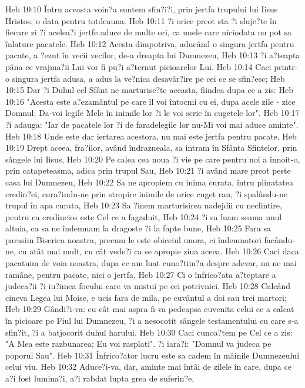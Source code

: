 Heb 10:10  Întru aceasta voin?a suntem sfin?i?i, prin jertfa trupului lui Iisus Hristos, o data pentru totdeauna.
Heb 10:11  ?i orice preot sta ?i sluje?te în fiecare zi ?i acelea?i jertfe aduce de multe ori, ca unele care niciodata nu pot sa înlature pacatele.
Heb 10:12  Acesta dimpotriva, aducând o singura jertfa pentru pacate, a ?ezut în vecii vecilor, de-a dreapta lui Dumnezeu,
Heb 10:13  ?i a?teapta pâna ce vrajma?ii Lui vor fi pu?i a?ternut picioarelor Lui.
Heb 10:14  Caci printr-o singura jertfa adusa, a adus la ve?nica desavâr?ire pe cei ce se sfin?esc;
Heb 10:15  Dar ?i Duhul cel Sfânt ne marturise?te aceasta, fiindca dupa ce a zis:
Heb 10:16  "Acesta este a?ezamântul pe care îl voi întocmi cu ei, dupa acele zile - zice Domnul: Da-voi legile Mele în inimile lor ?i le voi scrie în cugetele lor".
Heb 10:17  ?i adauga: "Iar de pacatele lor ?i de faradelegile lor nu-Mi voi mai aduce aminte".
Heb 10:18  Unde este dar iertarea acestora, nu mai este jertfa pentru pacate.
Heb 10:19  Drept aceea, fra?ilor, având îndrazneala, sa intram în Sfânta Sfintelor, prin sângele lui Iisus,
Heb 10:20  Pe calea cea noua ?i vie pe care pentru noi a înnoit-o, prin catapeteasma, adica prin trupul Sau,
Heb 10:21  ?i având mare preot peste casa lui Dumnezeu,
Heb 10:22  Sa ne apropiem cu inima curata, întru plinatatea credin?ei, cura?indu-ne prin stropire inimile de orice cuget rau, ?i spalându-ne trupul în apa curata,
Heb 10:23  Sa ?inem marturisirea nadejdii cu neclintire, pentru ca credincios este Cel ce a fagaduit,
Heb 10:24  ?i sa luam seama unul altuia, ca sa ne îndemnam la dragoste ?i la fapte bune,
Heb 10:25  Fara sa parasim Biserica noastra, precum le este obiceiul unora, ci îndemnatori facându-ne, cu atât mai mult, cu cât vede?i ca se apropie ziua aceea.
Heb 10:26  Caci daca pacatuim de voia noastra, dupa ce am luat cuno?tiin?a despre adevar, nu ne mai ramâne, pentru pacate, nici o jertfa,
Heb 10:27  Ci o înfrico?ata a?teptare a judeca?ii ?i iu?imea focului care va mistui pe cei potrivnici.
Heb 10:28  Calcând cineva Legea lui Moise, e ucis fara de mila, pe cuvântul a doi sau trei martori;
Heb 10:29  Gândi?i-va: cu cât mai aspra fi-va pedeapsa cuvenita celui ce a calcat în picioare pe Fiul lui Dumnezeu, ?i a nesocotit sângele testamentului cu care s-a sfin?it, ?i a batjocorit duhul harului.
Heb 10:30  Caci cunoa?tem pe Cel ce a zis: "A Mea este razbunarea; Eu voi rasplati". ?i iara?i: "Domnul va judeca pe poporul Sau".
Heb 10:31  Înfrico?ator lucru este sa cadem în mâinile Dumnezeului celui viu.
Heb 10:32  Aduce?i-va, dar, aminte mai întâi de zilele în care, dupa ce a?i fost lumina?i, a?i rabdat lupta grea de suferin?e,
